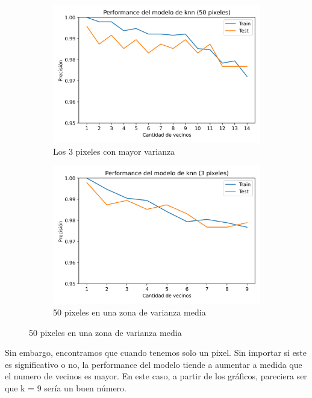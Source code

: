 \documentclass[10pt,a4paper]{article}
\begin{document}
\begin{figure}[ht!]
	\begin{subfigure}{0.5\textwidth}
		\includegraphics[width=0.9\linewidth]{Imagenes/50pixeles.png} 
		\caption{Los 3 pixeles con mayor varianza}
		\label{fig:subfig1}
	\end{subfigure}
	\begin{subfigure}{0.5\textwidth}
		\includegraphics[width=0.9\linewidth]{Imagenes/3pixeles.png}
		\caption{50 pixeles en una zona de varianza media}
		\label{fig:subfig2}
	\end{subfigure}
	\label{fig:subfigs}
\end{figure}

Sin embargo, encontramos que cuando tenemos solo un pixel. Sin importar si este es significativo o no, la performance del modelo tiende a aumentar a medida
que el numero de vecinos es mayor. En este caso, a partir de los gráficos, pareciera ser que k = 9 sería un buen número.
\end{document}
